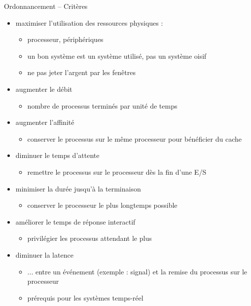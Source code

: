 \begin {frame} {Ordonnancement -- Critères}
    \begin {itemize}
	\item maximiser l'utilisation des ressources physiques :
	    \begin {itemize}
		\item processeur, périphériques \\
		\item un bon système est un système utilisé, pas un
		    système oisif
		\item \implique ne pas jeter l'argent par les fenêtres
	    \end {itemize}
	\item augmenter le débit 
	    \begin {itemize}
		\item nombre de processus terminés par unité de temps
	    \end {itemize}
	\item augmenter l'affinité
	    \begin {itemize}
		\item conserver le processus sur le même processeur
		    pour bénéficier du cache
	    \end {itemize}
	\item diminuer le temps d'attente
	    \begin {itemize}
		\item remettre le processus sur le processeur dès la fin
		    d'une E/S
	    \end {itemize}
	\item minimiser la durée jusqu'à la terminaison
	    \begin {itemize}
		\item conserver le processeur le plus longtemps possible
	    \end {itemize}
	\item améliorer le temps de réponse interactif
	    \begin {itemize}
		\item privilégier les processus attendant le plus
	    \end {itemize}
	\item diminuer la latence
	    \begin {itemize}
		\item ... entre un événement (exemple : signal) et
		    la remise du processus sur le processeur
		\item prérequis pour les systèmes temps-réel
	    \end {itemize}
    \end {itemize}
\end {frame}

